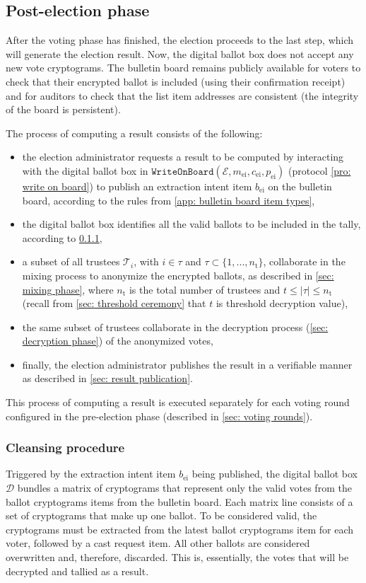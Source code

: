 \subsection{Post-election phase} \label{sec: post-election phase}
After the voting phase has finished, the election proceeds to the last step, which will generate the election result. Now, the digital ballot box does not accept any new vote cryptograms. The bulletin board remains publicly available for voters to check that their encrypted ballot is included (using their confirmation receipt) and for auditors to check that the list item addresses are consistent (the integrity of the board is persistent).

The process of computing a result consists of the following:
\begin{itemize}
    \item the election administrator requests a result to be computed by interacting with the digital ballot box in $\mathtt{WriteOnBoard}(\mathcal{E}, m_\mathrm{ei}, c_\mathrm{ei}, p_\mathrm{ei})$ (protocol \ref{pro: write on board}) to publish an extraction intent item $b_\mathrm{ei}$ on the bulletin board, according to the rules from \cref{app: bulletin board item types},
    \item the digital ballot box identifies all the valid ballots to be included in the tally, according to \cref{sec: cleansing procedure},
    \item a subset of all trustees $\mathcal{T}_i$, with $i \in \tau$ and $\tau \subset \{ 1, ..., n_\mathrm{t} \}$, collaborate in the mixing process to anonymize the encrypted ballots, as described in \cref{sec: mixing phase}, where $n_\mathrm{t}$ is the total number of trustees and $t \leq |\tau| \leq n_\mathrm{t}$ (recall from \cref{sec: threshold ceremony} that $t$ is threshold decryption value),
    \item the same subset of trustees collaborate in the decryption process (\cref{sec: decryption phase}) of the anonymized votes,
    \item finally, the election administrator publishes the result in a verifiable manner as described in \cref{sec: result publication}.
\end{itemize}

This process of computing a result is executed separately for each voting round configured in the pre-election phase (described in \cref{sec: voting rounds}).


\subsubsection{Cleansing procedure} \label{sec: cleansing procedure}
Triggered by the extraction intent item $b_\mathrm{ei}$ being published, the digital ballot box $\mathcal{D}$ bundles a matrix of cryptograms that represent only the valid votes from the ballot cryptograms items from the bulletin board. Each matrix line consists of a set of cryptograms that make up one ballot. To be considered valid, the cryptograms must be extracted from the latest ballot cryptograms item for each voter, followed by a cast request item. All other ballots are considered overwritten and, therefore, discarded. This is, essentially, the votes that will be decrypted and tallied as a result.

